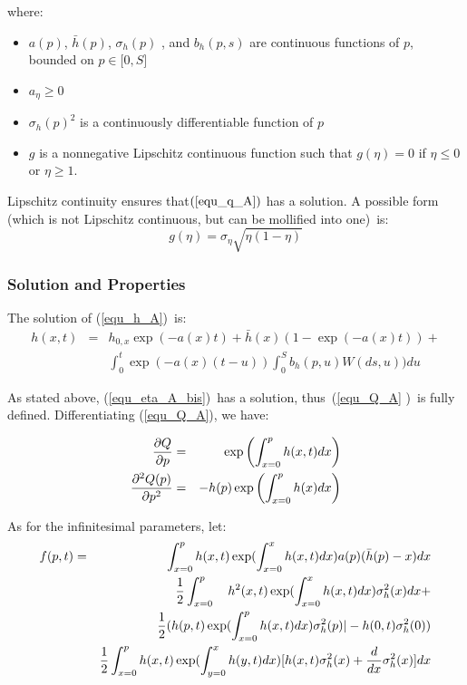 \documentclass{article}
\begin{document}
where:

\begin{itemize}
\item $a(p)$, $\bar{h}(p)$, $\sigma _{h}(p)$ , and $b_{h}(p,s)$ are
continuous functions of $p$, bounded on $p\in \lbrack 0,S]$

\item $a_{\eta }\geq 0$

\item $\sigma _{h}(p)^{2}$ is a continuously differentiable function of $p$

\item $g$ is a nonnegative Lipschitz continuous function such that $g(\eta
)=0$ if $\eta \leq 0$ or $\eta \geq 1$.
\end{itemize}

\bigskip

Lipschitz continuity ensures that$\left( \ref{equ_q_A}\right) $ has a
solution. A possible form (which is not Lipschitz continuous, but can be
mollified into one)\ is:%
\begin{equation*}
g(\eta )=\sigma _{\eta }\sqrt{\eta (1-\eta )}
\end{equation*}

\subsubsection{Solution and Properties}

The solution of (\ref{equ_h_A})\ is: 
\begin{eqnarray}
h(x,t) &=&h_{0,x}\exp (-a(x)t)+\bar{h}(x)(1-\exp (-a(x)t))+  \label{S1} \\
&&\int_{0}^{t}\exp (-a(x)(t-u))\int_{0}^{S}b_{h}(p,u)W(ds,u))du
\end{eqnarray}

As stated above, (\ref{equ_eta_A_bis})\ has a solution, thus\ (\ref{equ_Q_A}%
)\ is fully defined. Differentiating (\ref{equ_Q_A}), we have:

\begin{eqnarray}
\frac{\partial Q}{\partial p} &=&\exp \left( {\int_{x=0}^{p}h(x,t)dx}\right)
\label{dQdp_3} \\
\frac{\partial ^{2}Q(p)}{\partial p^{2}} &=&-{h(p)}\exp \left( {%
\int_{x=0}^{p}h(x)dx}\right)  \label{dQdp_2_3}
\end{eqnarray}%
\bigskip

As for the infinitesimal parameters, let:%
\begin{eqnarray}
f(p,t) &=&\int_{x=0}^{p}{h(x,t)}\exp ({\int_{x=0}^{x}h(x,t)dx)}a(p)(\bar{h}%
(p)-x)dx  \label{f_of_p} \\
&&\frac{1}{2}\int_{x=0}^{p}\text{ }{h}^{2}{(x,t)}\exp ({%
\int_{x=0}^{x}h(x,t)dx)}\sigma _{h}^{2}(x)dx+  \notag \\
&&\frac{1}{2}({h(p,t)}\exp ({\int_{x=0}^{p}h(x,t)dx)}\sigma _{h}^{2}(p)|-{%
h(0,t)}\sigma _{h}^{2}(0))  \notag \\
&&\frac{1}{2}\int_{x=0}^{p}{h(x,t)}\exp ({\int_{y=0}^{x}h(y,t)dx)[h(x,t)}%
\sigma _{h}^{2}(x)+\frac{d}{dx}\sigma _{h}^{2}(x)]dx  \notag
\end{eqnarray}
\end{document}
